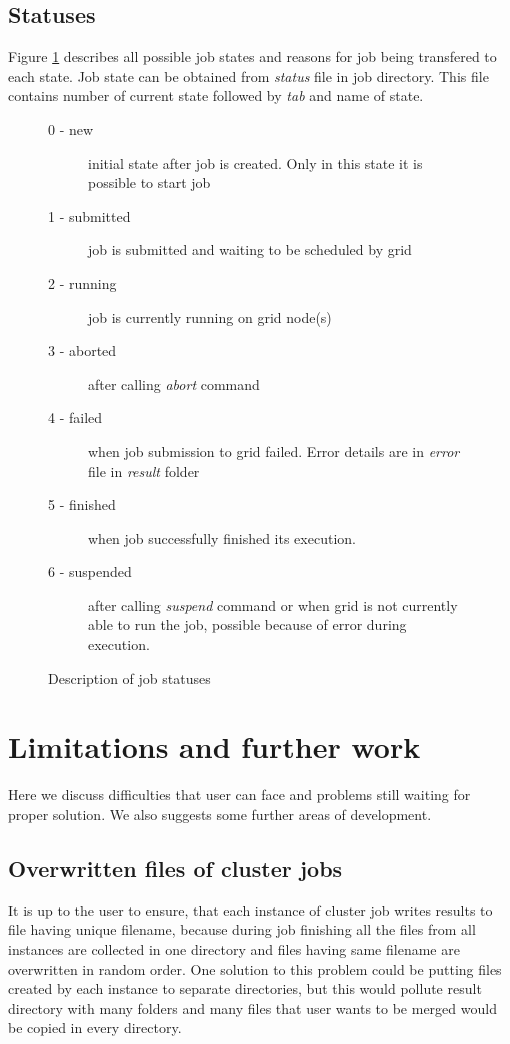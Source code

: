 \documentclass[a4paper,10pt,twocolumn]{article}
\newcommand{\code}[1]{\textit{#1}}
\begin{document}
\subsection{Statuses}

Figure \ref{statuses} describes all possible job states and reasons for job being transfered to each state. Job state can be obtained from \code{status} file in job directory. This file contains number of current state followed by \code{tab} and name of state.

\begin{figure}[h]
  \begin{description}
   \item[0 - new] initial state after job is created. Only in this state it is possible to start job
   \item[1 - submitted] job is submitted and waiting to be scheduled by grid
   \item[2 - running] job is currently running on grid node(s)
   \item[3 - aborted] after calling \code{abort} command
   \item[4 - failed] when job submission to grid failed. Error details are in \code{error} file in \code{result} folder
   \item[5 - finished] when job successfully finished its execution.
   \item[6 - suspended] after calling \code{suspend} command or when grid is not currently able to run the job, possible because of error during execution.
  \end{description}
  \caption{Description of job statuses}
  \label{statuses}
\end{figure}



\section{Limitations and further work}

Here we discuss difficulties that user can face and problems still waiting for proper solution. We also suggests some further areas of development.

\subsection{Overwritten files of cluster jobs}
It is up to the user to ensure, that each instance of cluster job writes results to file having unique filename, because during job finishing all the files from all instances are collected in one directory and files having same filename are overwritten in random order. One solution to this problem could be putting files created by each instance to separate directories, but this would pollute result directory with many folders and many files that user wants to be merged would be copied in every directory.
\end{document}
